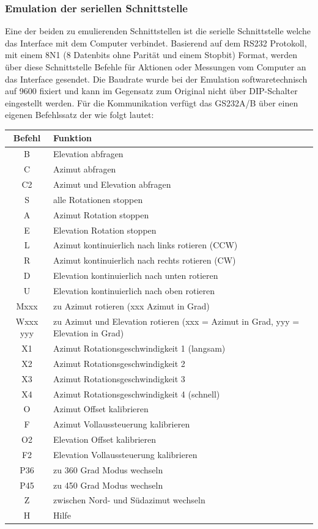 \subsubsection{Emulation der seriellen Schnittstelle}
Eine der beiden zu emulierenden Schnittstellen ist die serielle Schnittstelle welche das Interface mit dem Computer verbindet. Basierend auf dem RS232 Protokoll, mit einem 8N1 (8 Datenbits ohne Parität und einem Stopbit) Format, werden über diese Schnittstelle Befehle für Aktionen oder Messungen vom Computer an das Interface gesendet. Die Baudrate wurde bei der Emulation softwaretechnisch auf 9600 fixiert und kann im Gegensatz zum Original nicht über DIP-Schalter eingestellt werden. Für die Kommunikation verfügt das GS232A/B über einen eigenen Befehlssatz der wie folgt lautet:

\begin{tabular}{| c | l |}
	\hline
	\textbf{Befehl} & \textbf{Funktion} \\
	\hline
	B & Elevation abfragen \\
	\hline
	C & Azimut abfragen \\
	\hline
	C2 & Azimut und Elevation abfragen \\
	\hline
	S & alle Rotationen stoppen \\
	\hline
	A & Azimut Rotation stoppen \\
	\hline
	E & Elevation Rotation stoppen \\
	\hline
	L & Azimut kontinuierlich nach links rotieren (CCW) \\
	\hline
	R & Azimut kontinuierlich nach rechts rotieren (CW) \\
	\hline 
	D & Elevation kontinuierlich nach unten rotieren \\
	\hline 
	U & Elevation kontinuierlich nach oben rotieren \\
	\hline
	Mxxx & zu Azimut rotieren (xxx Azimut in Grad) \\
	\hline
	Wxxx yyy & zu Azimut und Elevation rotieren (xxx = Azimut in Grad, yyy = Elevation in Grad) \\
	\hline
	X1 & Azimut Rotationsgeschwindigkeit 1 (langsam)\\
	\hline
	X2 & Azimut Rotationsgeschwindigkeit 2 \\
	\hline
	X3 & Azimut Rotationsgeschwindigkeit 3 \\
	\hline
	X4 & Azimut Rotationsgeschwindigkeit 4 (schnell)\\
	\hline
	O & Azimut Offset kalibrieren \\
	\hline 
	F & Azimut Vollaussteuerung kalibrieren \\
	\hline
	O2 & Elevation Offset kalibrieren \\
	\hline
	F2 & Elevation Vollaussteuerung kalibrieren \\
	\hline 
	P36 & zu 360 Grad Modus wechseln \\
	\hline 
	P45 & zu 450 Grad Modus wechseln \\
	\hline 
	Z & zwischen Nord- und Südazimut wechseln \\
	\hline
	H & Hilfe \\
	\hline
\end{tabular}

